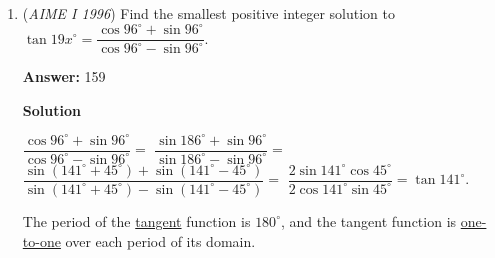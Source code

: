 \begin{enumerate}
 $1022, 1018,...,(2+4), 2$

 Pass $3$:

 $6, (6+4+4),...,(1022-4-4), 1022$

 Pass $4$:

 $1014, (1014-16),..., (6+16), 6$

 Pass $5$:

 $22, (22+32),..., (1014-32), 1014$

 Pass $6$:

 $982, (982-64),..., (22 + 64), 22$

 Pass $7$:

 $86, (86+128),..., (982-128), 982$

 Pass $8$:

 $854, (854-256),..., (86+256), 86$

 Pass $9$:

 $342, (342+512)$

 Pass $10$:

 $342$

 The answer is therefore $\boxed{342}.$

 


 Edit from EthanSpoon, Doing this with only even numbers will make it faster.You'll see.02496

 Edit from Iamaimogoldmedalist. Doing some few rounds in your head till you get Multiples of 4 or possibly numbers of the form 8k+2 will enhance your speed.

 


	\item (\textit{AIME I 1996}) Find the smallest positive integer solution to $\tan{19x^{\circ}}=\dfrac{\cos{96^{\circ}}+\sin{96^{\circ}}}{\cos{96^{\circ}}-\sin{96^{\circ}}}$.


 
 \textbf{Answer: }159



\textbf{Solution}

$\dfrac{\cos{96^{\circ}}+\sin{96^{\circ}}}{\cos{96^{\circ}}-\sin{96^{\circ}}} =$ $\dfrac{\sin{186^{\circ}}+\sin{96^{\circ}}}{\sin{186^{\circ}}-\sin{96^{\circ}}} =$ $\dfrac{\sin{(141^{\circ}+45^{\circ})}+\sin{(141^{\circ}-45^{\circ})}}{\sin{(141^{\circ}+45^{\circ})}-\sin{(141^{\circ}-45^{\circ})}} =$ $\dfrac{2\sin{141^{\circ}}\cos{45^{\circ}}}{2\cos{141^{\circ}}\sin{45^{\circ}}} = \tan{141^{\circ}}$. 

 The period of the \href{https://artofproblemsolving.com/wiki/index.php?title=Trigonometry\#Tangent}{tangent} function is $180^\circ$, and the tangent function is \href{https://artofproblemsolving.com/wiki/index.php?title=One-to-one}{one-to-one} over each period of its domain. 


\end{enumerate}

